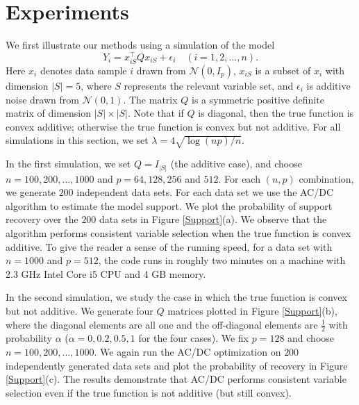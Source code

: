 \def\x{x}
\def\Q{Q}
\def\bds#1{#1}
\def\tts#1{\texttt{\small #1}}

\section{Experiments}
\label{sec:thesims}
We first illustrate our methods using a simulation of the model
\begin{equation}\nonumber
         Y_i = \x_{iS}^{\top}\Q\x_{iS} + \epsilon_i \quad (i=1,2,\ldots,n).
\end{equation}
Here $\x_{i}$ denotes data sample $i$ drawn from $\mathcal{N}(\bds{0},\bds{I}_{p})$, 
$\x_{iS}$ is a subset of $\x_i$ with dimension $|S|=5$, where $S$
represents the relevant variable set, and 
$\epsilon_i$ is additive noise drawn from $\mathcal{N}(0,1)$. 
The matrix $\Q$ is a symmetric positive definite matrix of dimension $|S|\times{}|S|$. 
Note that if $\Q$ is diagonal, then the true function is convex
additive; 
otherwise the true function is convex but not additive.
For all simulations in this section, we set $\lambda=4\sqrt{{\log(np)}/{n}}$.

In the first simulation, we set $\Q=\bds{I}_{|S|}$ (the additive
case), and choose $n=100, 200,\ldots,1000$ and $p=64,128,256$ and $512$.
For each $(n,p)$ combination, we generate $200$ independent data
sets. For each data set we use the AC/DC algorithm to estimate the model support.
We plot the probability of
support recovery over the $200$ data sets in Figure \ref{Support}(a).  We
observe that the algorithm performs consistent variable selection when the true
function is convex additive.    To give the reader a
sense of the running speed, for a 
data set with $n=1000$ and $p=512$, the code runs in roughly two 
minutes on a machine with 2.3 GHz Intel Core i5 CPU and 4 GB memory.

In the second simulation, we study the case in which the true function
is convex but not additive. We generate four $\Q$ matrices
plotted in Figure \ref{Support}(b), where the diagonal elements are all one and
the off-diagonal elements are $\frac{1}{2}$ with probability $\alpha$
($\alpha=0,0.2,0.5,1$ for the four cases). We fix $p=128$ and choose
$n=100,200,\ldots,1000$. We again run the AC/DC optimization on $200$
independently generated data sets and plot the probability of recovery
in Figure \ref{Support}(c). The results demonstrate that AC/DC performs
consistent variable selection even if the true function is not additive (but
still convex).

